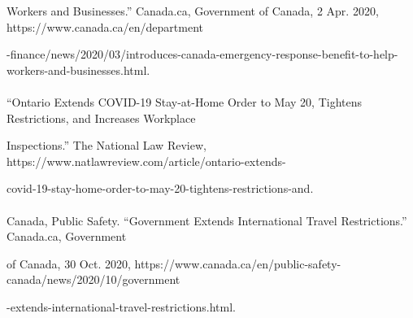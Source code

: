 \documentclass[fontsize=11pt]{article}
\begin{document}
\quadd Workers and Businesses.” Canada.ca, Government of Canada, 2 Apr. 2020, https://www.canada.ca/en/department

\quadd -finance/news/2020/03/introduces-canada-emergency-response-benefit-to-help-workers-and-businesses.html. 
\\\\“Ontario Extends COVID-19 Stay-at-Home Order to May 20, Tightens Restrictions, and Increases Workplace

\quadd Inspections.” The National Law Review, https://www.natlawreview.com/article/ontario-extends-

\quadd covid-19-stay-home-order-to-may-20-tightens-restrictions-and. 
\\\\ Canada, Public Safety. “Government Extends International Travel Restrictions.” Canada.ca, Government

\quadd of Canada, 30 Oct. 2020, https://www.canada.ca/en/public-safety-canada/news/2020/10/government

\quadd -extends-international-travel-restrictions.html. 


\end{document}
